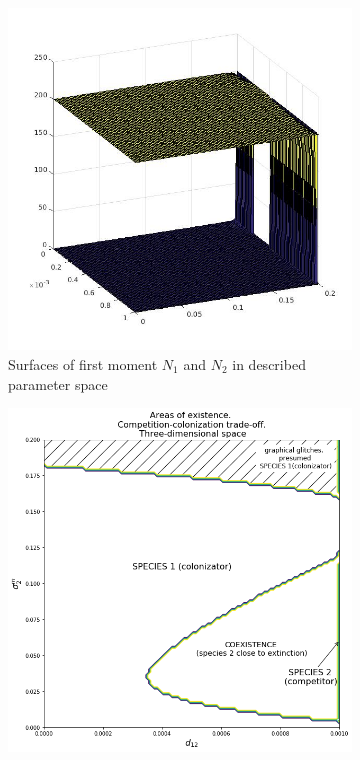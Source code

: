 \begin{figure}
	\centering
	\begin{subfigure}{.5\textwidth}
		\centering
		\includegraphics[width=.95\linewidth]{N1N2cctoD3.jpg}
		\caption{Surfaces of first moment \(N_1\) and \(N_2\) in described parameter space}
		\label{fig:cctod3:sub1}
	\end{subfigure}%
	\begin{subfigure}{.5\textwidth}
		\centering
		\includegraphics[width=.95\linewidth]{arccto08d3.png}

\end{subfigure}
\end{figure}
